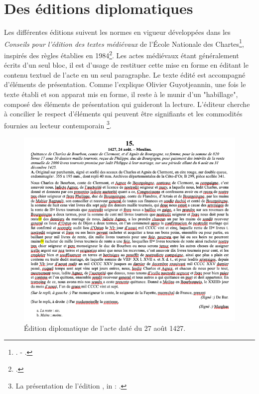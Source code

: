 \section{Des éditions diplomatiques}
\label{I.2.2}

\par Les différentes éditions suivent les normes en vigueur développées dans les \textit{Conseils pour l'édition des textes médiévaux} de l'École Nationale des Chartes\footnote{\cite{guyotjeanninConseilsPourEdition2014}. - \cite{guyotjeanninConseilsPourEdition2009}.}, inspirés des règles établies en 1984\footnote{\cite{c.i.d.NormesInternationalesPour1984}.}. Les actes médiévaux étant généralement écrits d'un seul bloc, il est d'usage de restituer cette mise en forme en éditant le contenu textuel de l'acte en un seul paragraphe. Le texte édité est accompagné d'éléments de présentation. Comme l'explique Olivier Guyotjeannin, \og une fois le texte établi et son apparat mis en forme, il reste à le munir d'un "habillage", composé des éléments de présentation qui guideront la lecture. L'éditeur cherche à concilier le respect d'éléments qui peuvent être signifiants et les commodités fournies au lecteur contemporain \fg \footnote{\og La présentation de l'édition \fg, in : \cite{guyotjeanninConseilsPourEdition2009}.}. 
\newline 

\begin{figure}[ht]
\centering
\includegraphics[scale =0.6]{front/images/edition.png}
\caption{Édition diplomatique de l'acte daté du 27 août 1427.}
\label{fig:ed_diplo}
\end{figure}

